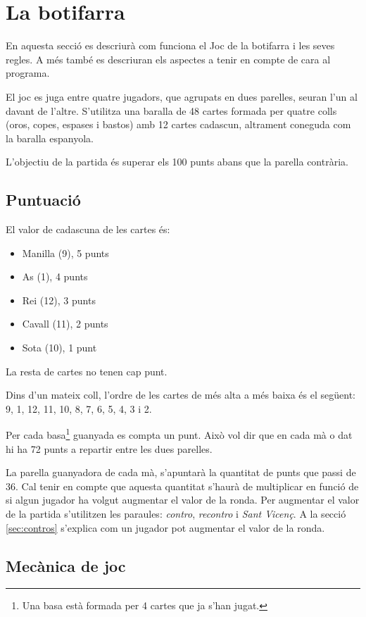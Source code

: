 \chapter{La botifarra}
\label{chap:botifarra}

En aquesta secció es descriurà com funciona el Joc de la botifarra i les seves regles. A més també es descriuran els aspectes a tenir en compte de cara al programa. 


El joc es juga entre quatre jugadors, que agrupats en dues parelles, seuran l'un al davant de l'altre. S'utilitza una baralla de 48 cartes formada per quatre colls (oros, copes, espases i bastos) amb 12 cartes cadascun, altrament coneguda com la baralla espanyola.


L'objectiu de la partida és superar els 100 punts abans que la parella contrària. 


\section{Puntuació}

El valor de cadascuna de les cartes és:
\begin{itemize}
	\item{Manilla (9), 5 punts}
    \item{As (1), 4 punts}
    \item{Rei (12), 3 punts}
    \item{Cavall (11), 2 punts}
    \item{Sota (10), 1 punt}
\end{itemize}

La resta de cartes no tenen cap punt.
    
Dins d'un mateix coll, l'ordre de les cartes de més alta a més baixa és el següent: 9, 1, 12, 11, 10, 8, 7, 6, 5, 4, 3 i 2.

Per cada basa\footnote{Una basa està formada per 4 cartes que ja s'han jugat.} guanyada es compta un punt. Això vol dir que en cada mà o dat hi ha 72 punts a repartir entre les dues parelles.

La parella guanyadora de cada mà, s'apuntarà la quantitat de punts que passi de 36. Cal tenir en compte que aquesta quantitat s'haurà de multiplicar en funció de si algun jugador ha volgut augmentar el valor de la ronda. Per augmentar el valor de la partida s'utilitzen les paraules: \emph{contro}, \emph{recontro} i \emph{Sant Vicenç}. A la secció \ref{sec:contros} s'explica com un jugador pot augmentar el valor de la ronda. 

\section{Mecànica de joc}


